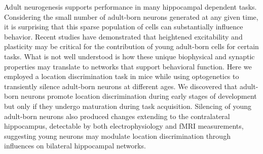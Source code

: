 Adult neurogenesis supports performance in many hippocampal dependent tasks. Considering the small number of adult-born neurons generated at any given time, it is surprising that this sparse population of cells can substantially influence behavior. Recent studies have demonstrated that heightened excitability and plasticity may be critical for the contribution of young adult-born cells for certain tasks. What is not well understood is how these unique biophysical and synaptic properties may translate to networks that support behavioral function. Here we employed a location discrimination task in mice while using optogenetics to transiently silence adult-born neurons at different ages. We discovered that adult-born neurons promote location discrimination during early stages of development but only if they undergo maturation during task acquisition. Silencing of young adult-born neurons also produced changes extending to the contralateral hippocampus, detectable by both electrophysiology and fMRI measurements, suggesting young neurons may modulate location discrimination through influences on bilateral hippocampal networks.
